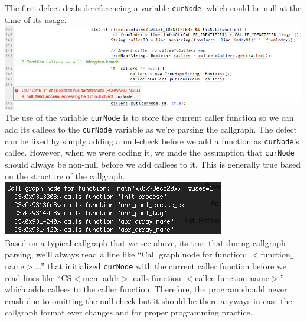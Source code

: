 \documentclass{article}
\begin{document}
The first defect deals dereferencing a variable \verb|curNode|, which could be null at the time of its usage. \\
\includegraphics[scale=0.5]{ss/bug_null_dereference.png} \\
The use of the variable \verb|curNode| is to store the current caller function so we can add its callees to the \verb|curNode| variable as we're parsing the callgraph. The defect can be fixed by simply adding a null-check before we add a function as \verb|curNode|'s callee. However, when we were coding it, we made the assumption that \verb|curNode| should always be non-null before we add callees to it. This is generally true based on the structure of the callgraph. \\
\includegraphics[scale=0.5]{ss/example_callgraph.png} \\
Based on a typical callgraph that we see above, its true that during callgraph parsing, we'll always read a line like ``Call graph node for function: $<$function$\_$name$>$...'' that initialized \verb|curNode| with the current caller function before we read lines like ``CS$<$mem$\_$addr$>$ calls function $<$callee$\_$function$\_$name$>$'' which adds callees to the caller function. Therefore, the program should never crash due to omitting the null check but it should be there anyways in case the callgraph format ever changes and for proper programming practice. \\
\end{document}
